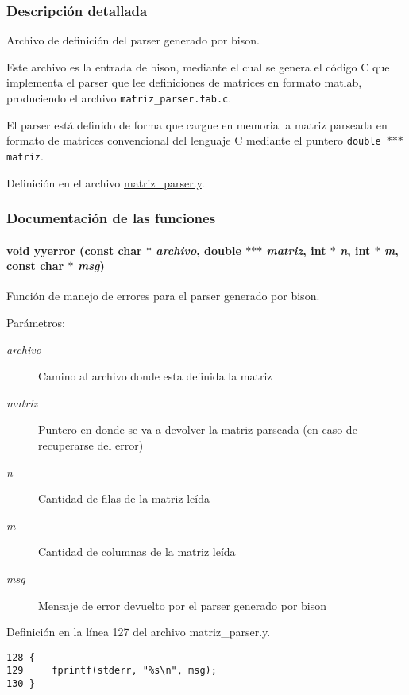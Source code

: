 \subsubsection{Descripción detallada}
Archivo de definición del parser generado por bison. 

Este archivo es la entrada de bison, mediante el cual se genera el código C que implementa el parser que lee definiciones de matrices en formato matlab, produciendo el archivo {\tt matriz\_\-parser.tab.c}.

El parser está definido de forma que cargue en memoria la matriz parseada en formato de matrices convencional del lenguaje C mediante el puntero {\tt double $\ast$$\ast$$\ast$matriz}. 

Definición en el archivo \hyperlink{matriz__parser_8y-source}{matriz\_\-parser.y}.

\subsubsection{Documentación de las funciones}
\hypertarget{matriz__parser_8y_6bbce3a09233d68cbfb268cd87cdc360}{
\paragraph{\setlength{\rightskip}{0pt plus 5cm}void yyerror (const char $\ast$ {\em archivo}, \/  double $\ast$$\ast$$\ast$ {\em matriz}, \/  int $\ast$ {\em n}, \/  int $\ast$ {\em m}, \/  const char $\ast$ {\em msg})}\hfill}
\label{matriz__parser_8y_6bbce3a09233d68cbfb268cd87cdc360}


Función de manejo de errores para el parser generado por bison. 

\begin{Desc}
\item[Parámetros:]
\begin{description}
\item[{\em archivo}]Camino al archivo donde esta definida la matriz \item[{\em matriz}]Puntero en donde se va a devolver la matriz parseada (en caso de recuperarse del error) \item[{\em n}]Cantidad de filas de la matriz leída \item[{\em m}]Cantidad de columnas de la matriz leída \item[{\em msg}]Mensaje de error devuelto por el parser generado por bison \end{description}
\end{Desc}


Definición en la línea 127 del archivo matriz\_\-parser.y.

\begin{Code}\begin{verbatim}128 {
129     fprintf(stderr, "%s\n", msg);
130 }
\end{verbatim}
\end{Code}


